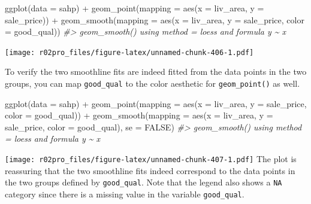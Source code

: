 \documentclass[
]{book}
\newenvironment{Shaded}{\begin{snugshade}}{\end{snugshade}}
\newcommand{\AttributeTok}[1]{\textcolor[rgb]{0.77,0.63,0.00}{#1}}
\newcommand{\CommentTok}[1]{\textcolor[rgb]{0.56,0.35,0.01}{\textit{#1}}}
\newcommand{\ConstantTok}[1]{\textcolor[rgb]{0.00,0.00,0.00}{#1}}
\newcommand{\FunctionTok}[1]{\textcolor[rgb]{0.00,0.00,0.00}{#1}}
\newcommand{\NormalTok}[1]{#1}
\newcommand{\SpecialCharTok}[1]{\textcolor[rgb]{0.00,0.00,0.00}{#1}}
\begin{document}
\begin{Shaded}
\begin{Highlighting}[]
\FunctionTok{ggplot}\NormalTok{(}\AttributeTok{data =}\NormalTok{ sahp) }\SpecialCharTok{+} \FunctionTok{geom\_point}\NormalTok{(}\AttributeTok{mapping =} \FunctionTok{aes}\NormalTok{(}\AttributeTok{x =}\NormalTok{ liv\_area, }\AttributeTok{y =}\NormalTok{ sale\_price)) }\SpecialCharTok{+} \FunctionTok{geom\_smooth}\NormalTok{(}\AttributeTok{mapping =} \FunctionTok{aes}\NormalTok{(}\AttributeTok{x =}\NormalTok{ liv\_area, }\AttributeTok{y =}\NormalTok{ sale\_price, }\AttributeTok{color =}\NormalTok{ good\_qual))}
\CommentTok{\#\textgreater{} \textasciigrave{}geom\_smooth()\textasciigrave{} using method = \textquotesingle{}loess\textquotesingle{} and formula \textquotesingle{}y \textasciitilde{} x\textquotesingle{}}
\end{Highlighting}
\end{Shaded}

\texttt{[image: r02pro\_files/figure-latex/unnamed-chunk-406-1.pdf]}

To verify the two smoothline fits are indeed fitted from the data points in the two groups, you can map \texttt{good\_qual} to the color aesthetic for \texttt{geom\_point()} as well.

\begin{Shaded}
\begin{Highlighting}[]
\FunctionTok{ggplot}\NormalTok{(}\AttributeTok{data =}\NormalTok{ sahp) }\SpecialCharTok{+} \FunctionTok{geom\_point}\NormalTok{(}\AttributeTok{mapping =} \FunctionTok{aes}\NormalTok{(}\AttributeTok{x =}\NormalTok{ liv\_area, }\AttributeTok{y =}\NormalTok{ sale\_price, }\AttributeTok{color =}\NormalTok{ good\_qual)) }\SpecialCharTok{+} \FunctionTok{geom\_smooth}\NormalTok{(}\AttributeTok{mapping =} \FunctionTok{aes}\NormalTok{(}\AttributeTok{x =}\NormalTok{ liv\_area, }\AttributeTok{y =}\NormalTok{ sale\_price, }\AttributeTok{color =}\NormalTok{ good\_qual), }\AttributeTok{se =} \ConstantTok{FALSE}\NormalTok{)}
\CommentTok{\#\textgreater{} \textasciigrave{}geom\_smooth()\textasciigrave{} using method = \textquotesingle{}loess\textquotesingle{} and formula \textquotesingle{}y \textasciitilde{} x\textquotesingle{}}
\end{Highlighting}
\end{Shaded}

\texttt{[image: r02pro\_files/figure-latex/unnamed-chunk-407-1.pdf]}
The plot is reassuring that the two smoothline fits indeed correspond to the data points in the two groups defined by \texttt{good\_qual}. Note that the legend also shows a \texttt{NA} category since there is a missing value in the variable \texttt{good\_qual}.
\end{document}
